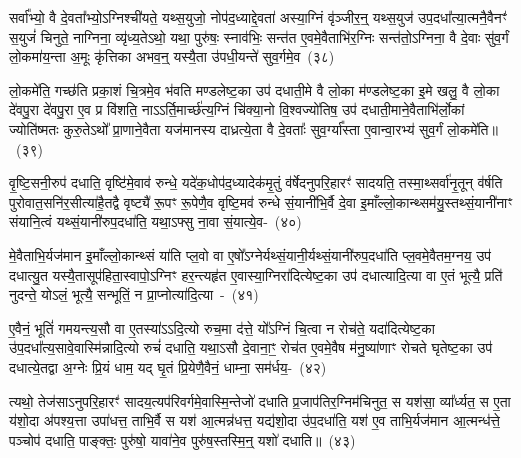 {\anuvakamend[{तेज॑ ए॒व प॒शवः॑ प॒शवो॒ यज॑मान॒ एक॑ञ्च}]}

सर्वा᳚भ्यो॒ वै दे॒वता᳚भ्यो॒\-ऽग्निश्ची॑यते॒ यथ्स॒युजो॒ नोप॑द॒ध्याद्दे॒वता॑ अस्या॒ग्निं वृ॑ञ्जीर॒न्॒ यथ्स॒युज॑ उप॒दधा᳚त्या॒त्मनै॒वैनꣳ॑ स॒युजं॑ चिनुते॒ नाग्निना॒ व्यृ॑ध्य॒ते\-ऽथो॒ यथा॒ पुरु॑षः॒ स्नाव॑भिः॒ सन्त॑त ए॒वमे॒वैताभि॑र॒ग्निः सन्त॑तो॒\-ऽग्निना॒ वै दे॒वाः सु॑व॒र्गं लो॒कमा॑य॒न्ता अ॒मूः कृ॑त्तिका अभव॒न्॒ यस्यै॒ता उ॑पधी॒यन्ते॑ सुव॒र्गमे॒व~(३८)\ip

लो॒कमे॑ति॒ गच्छ॑ति प्रका॒शं चि॒त्रमे॒व भ॑वति मण्डलेष्ट॒का उप॑ दधाती॒मे वै लो॒का म॑ण्डलेष्ट॒का इ॒मे खलु॒ वै लो॒का दे॑वपु॒रा दे॑वपु॒रा ए॒व प्र वि॑शति॒ नाऽऽर्ति॒मार्च्छ॑त्य॒ग्निं चि॑क्या॒नो वि॒श्वज्यो॑तिष॒ उप॑ दधाती॒माने॒वैताभि॑र्लो॒कां ज्योति॑ष्मतः कुरु॒ते\-ऽथो᳚ प्रा॒णाने॒वैता यज॑मानस्य दाध्रत्ये॒ता वै दे॒वताः᳚ सुव॒र्ग्या᳚स्ता ए॒वान्वा॒रभ्य॑ सुव॒र्गं लो॒कमे॑ति॥~(३९)\ip

{\anuvakamend[{सु॒व॒र्गमे॒व ता ए॒व च॒त्वारि॑ च}]}

वृ॒ष्टि॒सनी॒रुप॑ दधाति॒ वृष्टि॑मे॒वाव॑ रुन्धे॒ यदे॑क॒धोप॑द॒ध्यादेक॑मृ॒तुं व॑र्\mbox{}षेदनुपरि॒हारꣳ॑ सादयति॒ तस्मा॒थ्सर्वा॑नृ॒तून् व॑र्\mbox{}षति पुरोवात॒सनि॑र॒सीत्या॑है॒तद्वै वृष्ट्यै॑ रू॒पꣳ रू॒पेणै॒व वृष्टि॒मव॑ रुन्धे सं॒यानी॑भि॒र्वै दे॒वा इ॒माँल्लो॒कान्थ्सम॑यु॒स्तथ्सं॒यानी॑नाꣳ संयानि॒त्वं यथ्सं॒यानी॑रुप॒\-दधा॑ति॒ यथा॒\-ऽ\-फ्सु ना॒वा सं॒यात्ये॒व-~(४०)\ip

मे॒वैताभि॒र्यज॑मान इ॒माँल्लो॒कान्थ्सं या॑ति प्ल॒वो वा ए॒षो᳚\-ऽग्नेर्यथ्सं॒यानी॒र्यथ्सं॒यानी॑रुप॒\-दधा॑ति प्ल॒वमे॒वैतम॒ग्नय॒ उप॑ दधात्यु॒त यस्यै॒तासूप॑हिता॒स्वापो॒\-ऽग्निꣳ हर॒न्त्यहृ॑त ए॒वास्या॒ग्निरा॑दित्येष्ट॒का उप॑ दधात्यादि॒त्या वा ए॒तं भूत्यै॒ प्रति॑ नुदन्ते॒ यो\-ऽलं॒ भूत्यै॒ सन्भूतिं॒ न प्रा॒प्नोत्या॑दि॒त्या~-~(४१)\ip

ए॒वैनं॒ भूतिं॑ गमयन्त्य॒सौ वा ए॒तस्या॑ऽऽदि॒त्यो रुच॒मा द॑त्ते॒ यो᳚\-ऽग्निं चि॒त्वा न रोच॑ते॒ यदा॑दित्येष्ट॒का उ॑प॒दधा᳚त्य॒सावे॒वास्मि॑न्नादि॒त्यो रुचं॑ दधाति॒ यथा॒ऽसौ दे॒वाना॒ꣳ॒ रोच॑त ए॒वमे॒वैष म॑नु॒ष्या॑णाꣳ रोचते घृतेष्ट॒का उप॑ दधात्ये॒तद्वा अ॒ग्नेः प्रि॒यं धाम॒ यद् घृ॒तं प्रि॒येणै॒वैनं॒ धाम्ना॒ सम॑र्धय॒-~(४२)\ip

त्यथो॒ तेज॑सा\-ऽ\-नुपरि॒हारꣳ॑ सादय॒त्यप॑रिवर्गमे॒वास्मि॒न्तेजो॑ दधाति प्र॒जा\-प॑तिर॒ग्निम॑चिनुत॒ स यश॑सा॒ व्या᳚र्ध्यत॒ स ए॒ता य॑शो॒दा अ॑पश्य॒त्ता उपा॑धत्त॒ ताभि॒र्वै स यश॑ आ॒त्मन्न॑धत्त॒ यद्य॑शो॒दा उ॑प॒\-दधा॑ति॒ यश॑ ए॒व ताभि॒र्यज॑मान आ॒त्मन्ध॑त्ते॒ पञ्चोप॑ दधाति॒ पाङ्क्तः॒ पुरु॑षो॒ यावा॑ने॒व पुरु॑ष॒स्तस्मि॒न्॒ यशो॑ दधाति॥~(४३)\ip

{\anuvakamend[{ए॒वं प्रा॒प्नोत्या॑दि॒त्या अ॑र्धय॒त्येका॒न्नप॑ञ्चा॒शच्च॑}]}%

